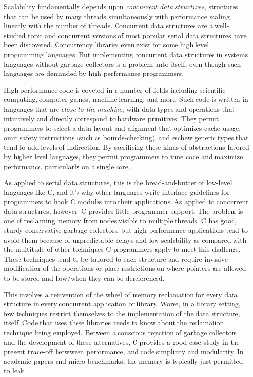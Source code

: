 Scalability fundamentally depends upon \textit{concurrent data structures}, structures that can be used by many threads simultaneously with performance scaling linearly with the number of threads.  Concurrent data structures are a well-studied topic and concurrent versions of most popular serial data structures have been discovered\cite{HSBook}.  Concurrency libraries even exist for some high level programming languages.\cite{JavaUtilConcurrent}  But implementing concurrent data structures in systems languages without garbage collectors is a problem unto itself, even though such languages are demanded by high performance programmers.

High performance code is coveted in a number of fields including scientific computing, computer games, machine learning, and more.  Such code is written in languages that are \textit{close to the machine}, with data types and operations that intuitively and directly correspond to hardware primitives.\cite{Ritchie}  They permit programmers to select a data layout and alignment that optimizes cache usage, omit safety instructions (such as bounds-checking), and eschew generic types that tend to add levels of indirection.  By sacrificing these kinds of abstractions favored by higher level languages, they permit programmers to tune code and maximize performance, particularly on a single core.

As applied to serial data structures, this is the bread-and-butter of low-level languages like C, and it's why other languages write interface guidelines for programmers to hook C modules into their applications.  As applied to concurrent data structures, however, C provides little programmer support.  The problem is one of reclaiming memory from nodes visible to multiple threads.  C has good, sturdy conservative garbage collectors\cite{BDW, DotNetGC}, but high performance applications tend to avoid them because of unpredictable delays and low scalability as compared with the multitude of other techniques C programmers apply to meet this challenge.  These techniques tend to be tailored to each structure and require invasive modification of the operations or place restrictions on where pointers are allowed to be stored and how/when they can be dereferenced.\cite{HP, DTA, StackTrack, Threadscan, RCU, RLU}

This involves a reinvention of the wheel of memory reclamation for every data structure in every concurrent application or library.  Worse, in a library setting, few techniques restrict themselves to the implementation of the data structure, itself.  Code that uses these libraries needs to know about the reclamation technique being employed.  Between a conscious rejection of garbage collectors and the development of these alternatives, C provides a good case study in the present trade-off betwween performance, and code simplicity and modularity.  In academic papers and micro-benchmarks, the memory is typically just permitted to leak.

